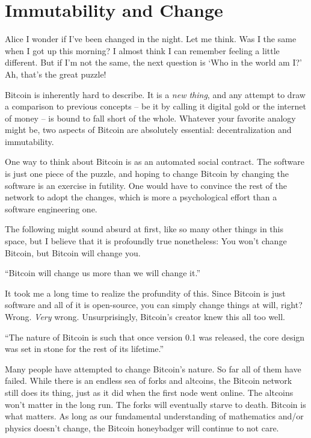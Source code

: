 \chapter{Immutability and Change}
\label{les:1}

\begin{chapquote}{Alice}
I wonder if I've been changed in the night. Let me think. Was I the same when I
got up this morning? I almost think I can remember feeling a little different.
But if I'm not the same, the next question is `Who in the world am I?' Ah,
that's the great puzzle!
\end{chapquote}

Bitcoin is inherently hard to describe. It is a \textit{new thing}, and any
attempt to draw a comparison to previous concepts -- be it by calling
it digital gold or the internet of money -- is bound to fall short of
the whole. Whatever your favorite analogy might be, two aspects of
Bitcoin are absolutely essential: decentralization and immutability.

One way to think about Bitcoin is as an automated social
contract.\cite{social-contract} The software is just one piece of the puzzle,
and hoping to change Bitcoin by changing the software is an exercise in
futility. One would have to convince the rest of the network to adopt the
changes, which is more a psychological effort than a software engineering one.

The following might sound absurd at first, like so many other things in
this space, but I believe that it is profoundly true nonetheless: You
won't change Bitcoin, but Bitcoin will change you.

\begin{chapquote}{\cite{tftc21}}
``Bitcoin will change us more than we will change it.''
\end{chapquote}

It took me a long time to realize the profundity of this. Since Bitcoin
is just software and all of it is open-source, you can simply change
things at will, right? Wrong. \textit{Very} wrong. Unsurprisingly, Bitcoin's
creator knew this all too well.

\begin{chapquote}{\cite{satoshi-set-in-stone}}
``The nature of Bitcoin is such that once version 0.1 was released, the core
design was set in stone for the rest of its
lifetime.''
\end{chapquote}

Many people have attempted to change Bitcoin's nature. So far all of
them have failed. While there is an endless sea of forks and altcoins,
the Bitcoin network still does its thing, just as it did when the first
node went online. The altcoins won't matter in the long run. The forks
will eventually starve to death. Bitcoin is what matters. As long as our
fundamental understanding of mathematics and/or physics doesn't change,
the Bitcoin honeybadger will continue to not care.


